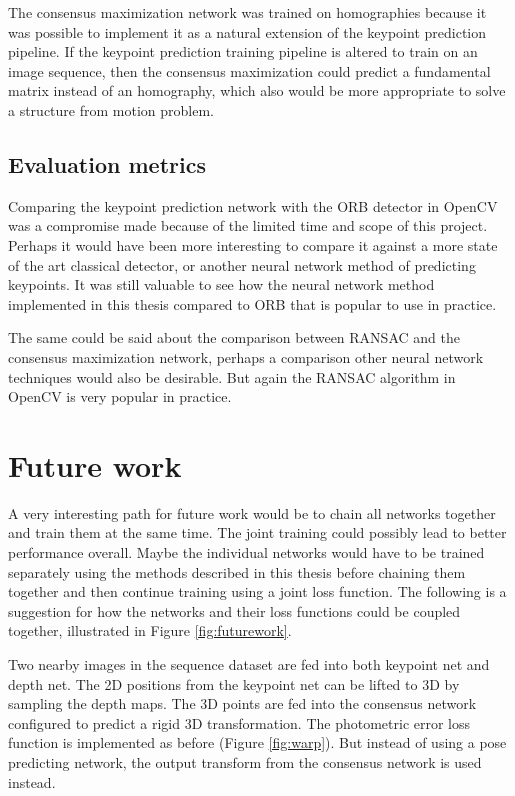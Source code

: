 The consensus maximization network was trained on homographies because it was possible to implement it as a natural extension of the keypoint prediction pipeline. If the keypoint prediction training pipeline is altered to train on an image sequence, then the consensus maximization could predict a fundamental matrix instead of an homography, which also would be more appropriate to solve a structure from motion problem.

\subsection{Evaluation metrics}

Comparing the keypoint prediction network with the ORB detector in OpenCV was a compromise made because of the limited time and scope of this project. Perhaps it would have been more interesting to compare it against a more state of the art classical detector, or another neural network method of predicting keypoints. It was still valuable to see how the neural network method implemented in this thesis compared to ORB that is popular to use in practice.

The same could be said about the comparison between RANSAC and the consensus maximization network, perhaps a comparison other neural network techniques would also be desirable. But again the RANSAC algorithm in OpenCV is very popular in practice.

\section{Future work}

A very interesting path for future work would be to chain all networks together and train them at the same time. The joint training could possibly lead to better performance overall. Maybe the individual networks would have to be trained separately using the methods described in this thesis before chaining them together and then continue training using a joint loss function. The following is a suggestion for how the networks and their loss functions could be coupled together, illustrated in Figure \ref{fig:futurework}.

Two nearby images in the sequence dataset are fed into both keypoint net and depth net. The 2D positions from the keypoint net can be lifted to 3D by sampling the depth maps. The 3D points are fed into the consensus network configured to predict a rigid 3D transformation. The photometric error loss function is implemented as before (Figure \ref{fig:warp}). But instead of using a pose predicting network, the output transform from the consensus network is used instead.

